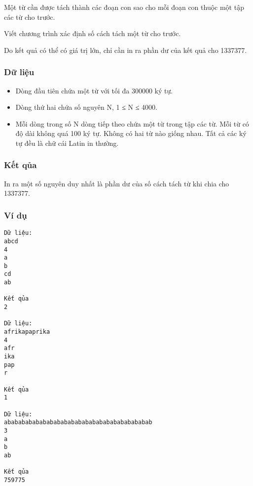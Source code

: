 



   Một từ cần được tách thành các đoạn con sao cho mỗi đoạn con thuộc một tập các từ cho trước.  

   Viết chương trình xác định số cách tách một từ cho trước.  

   Do kết quả có thể có giá trị lớn, chỉ cần in ra phần dư của kết quả cho 1337377.  

\subsubsection{   Dữ liệu  }
\begin{itemize}
	\item     Dòng đầu tiên chứa một từ với tối đa 300000 ký tự.   
	\item     Dòng thứ hai chứa số nguyên N, 1 ≤ N ≤ 4000.   
	\item     Mỗi dòng trong số N dòng tiếp theo chứa một từ trong tập các từ. Mỗi từ có độ dài không quá 100 ký tự. Không có hai từ nào giống nhau. Tất cả   các ký tự đều là chữ cái Latin in thường.   
\end{itemize}

\subsubsection{   Kết qủa  }

   In ra một số nguyên duy nhất là phần dư của số cách tách từ khi chia cho 1337377.  

\subsubsection{   Ví dụ  }
\begin{verbatim}
Dữ liệu:
abcd
4
a
b
cd
ab

Kết qủa
2

Dữ liệu:
afrikapaprika
4
afr
ika
pap
r

Kết qủa
1

Dữ liệu:
ababababababababababababababababababababab
3
a
b
ab

Kết qủa
759775
\end{verbatim}